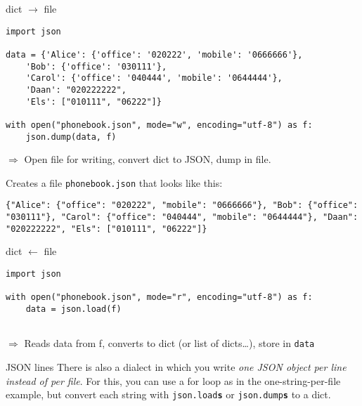 




\begin{frame}[fragile]{dict $\rightarrow$ file}
\begin{lstlisting}
import json

data = {'Alice': {'office': '020222', 'mobile': '0666666'},
    'Bob': {'office': '030111'},
    'Carol': {'office': '040444', 'mobile': '0644444'},
    'Daan': "020222222",
    'Els': ["010111", "06222"]}

with open("phonebook.json", mode="w", encoding="utf-8") as f:
    json.dump(data, f)

\end{lstlisting}
$\Rightarrow$ Open file for writing, convert dict to JSON, dump in file.

Creates a file \texttt{phonebook.json} that looks like this:
\begin{lstlisting}
{"Alice": {"office": "020222", "mobile": "0666666"}, "Bob": {"office": "030111"}, "Carol": {"office": "040444", "mobile": "0644444"}, "Daan": "020222222", "Els": ["010111", "06222"]}
\end{lstlisting}
\end{frame}




\begin{frame}[fragile]{dict $\leftarrow$ file}
\begin{lstlisting}
import json

with open("phonebook.json", mode="r", encoding="utf-8") as f:
	data = json.load(f)
	
\end{lstlisting}

$\Rightarrow$ Reads data from f, converts to dict (or list of dicts\ldots), store in \texttt{data}

\pause

\small
\begin{alertblock}{JSON lines}
There is also a dialect in which you write \emph{one JSON object per line instead of per file}. For this, you can use a for loop as in the one-string-per-file example, but convert each string with  \texttt{json.load\textbf{s}} or \texttt{json.dump\textbf{s}} to a dict.
\end{alertblock}


\end{frame}




